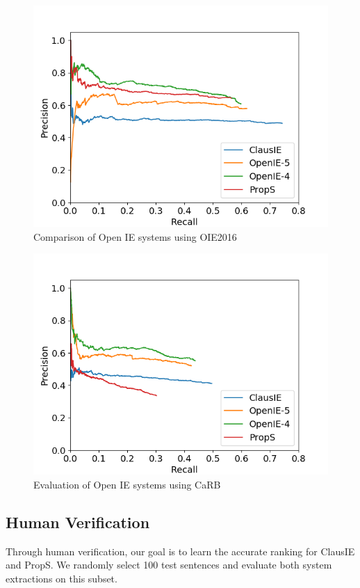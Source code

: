         \begin{figure}[h!]
            \centering
        \vspace*{-2ex}
            \includegraphics[width=0.7\columnwidth]{images/oie16.png}
            \caption{Comparison of Open IE systems using OIE2016}
            \label{fig:pr_oie16}
        \end{figure}
        
        \begin{figure}[h!]
            \centering
        \vspace*{-3ex}
            \includegraphics[width=0.7\columnwidth]{images/carb.png}
            \caption{Evaluation of Open IE systems using CaRB}
            \label{fig:pr_carb}
        \end{figure}

    
    \subsection{Human Verification}
        Through human verification, our goal is to learn the accurate ranking for ClausIE and PropS.  We randomly select 100 test sentences and evaluate both system extractions on this subset. 

